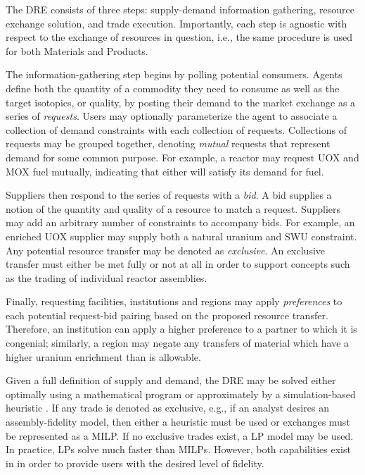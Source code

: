 The \gls{DRE} consists of three steps: supply-demand information
gathering, resource exchange solution, and trade execution. Importantly, each
step is agnostic with respect to the exchange of resources in question, i.e.,
the same procedure is used for both Materials and Products.

The information-gathering step begins by polling potential consumers. Agents
define both the quantity of a commodity they need to consume as well as the
target isotopics, or quality, by posting their demand to the market exchange as
a series of \textit{requests}. Users may optionally parameterize the agent to
associate a collection of demand constraints with each collection of requests.
Collections of requests may be grouped together, denoting \textit{mutual}
requests that represent demand for
some common purpose. For example, a reactor may request \gls{UOX} and \gls{MOX} fuel
mutually, indicating that either will satisfy its demand for fuel.

Suppliers then respond to the series of requests with a \textit{bid}. A bid
supplies a notion of the quantity and quality of a resource to match a
request. Suppliers may add an arbitrary number of constraints to accompany
bids. For example, an enriched \gls{UOX} supplier may supply both a natural uranium
and SWU constraint. Any potential resource transfer may be denoted as
\textit{exclusive}. An exclusive transfer must either be met fully or not at all
in order to support concepts such as the trading of individual reactor
assemblies.

Finally, requesting facilities, institutions and regions may apply
\textit{preferences} to each potential request-bid pairing based on the proposed
resource transfer. Therefore, an institution can apply a higher preference to a
partner to which it is congenial; similarly, a region may negate any transfers
of material which have a higher uranium enrichment than is allowable.

Given a full definition of supply and demand, the \gls{DRE} may be solved either
optimally using a mathematical program or approximately by a simulation-based
heuristic \cite{Gidden2014}. If any trade is denoted as exclusive, e.g., if an
analyst desires an assembly-fidelity model, then either a heuristic must be used
or exchanges must be represented as a \gls{MILP}. If no exclusive trades exist,
a \gls{LP} model may be used. In practice, LPs solve much faster than
\gls{MILP}s. However, both capabilities exist in \Cyclus in order to
provide users with the desired level of fidelity.


